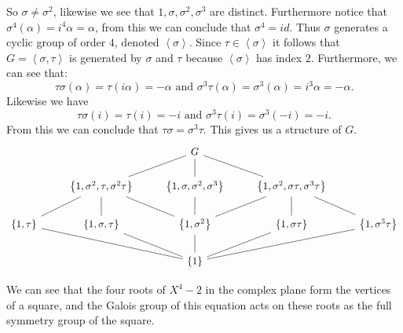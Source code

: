 \begin{example}[]
So $\sigma\neq \sigma^2$, likewise we see that $1,\sigma,\sigma^2,\sigma^3$ are distinct.
Furthermore notice that $\sigma^4(\alpha) = i^4\alpha = \alpha$, from this we can conclude that  $\sigma^4 = id$. Thus  $\sigma$ generates a cyclic group of order $4$, denoted $\left<\sigma \right>$. Since $\tau\in\left<\sigma \right>$ it follows that $G=\left<\sigma, \tau \right>$ is generated by $\sigma$ and $\tau$ because $\left<\sigma \right>$ has index $2$. Furthermore, we can see that: \[
    \tau\sigma(\alpha) = \tau(i\alpha) = -\alpha \text{ and }\sigma^3\tau(\alpha) = \sigma^3(\alpha) = i^3\alpha=-\alpha.
\]
Likewise we have \[
    \tau\sigma(i) = \tau(i) = -i \text{ and } \sigma^3\tau(i) = \sigma^3(-i) = -i.
\]
From this we can conclude that $\tau\sigma = \sigma^3\tau$. This gives us a structure of $G$. \begin{equation}
\begin{tikzcd}
   && G \ar[dr, dash] \ar[d, dash] \ar[dl, dash]  &&\\
   &\left\{ 1,\sigma^2,\tau,\sigma^2\tau \right\} \ar[dl, dash]\ar[d,dash]\ar[dr,dash]  & \left\{ 1,\sigma,\sigma^2,\sigma^3 \right\}\ar[d,dash] & \left\{ 1,\sigma^2, \sigma\tau,\sigma^3\tau \right\}\ar[dl,dash]\ar[d,dash]\ar[dr,dash] &\\
    \left\{1,\tau  \right\}\ar[drr,dash]  & \left\{ 1,\sigma,\tau \right\} \ar[dr,dash]& \left\{ 1,\sigma^2 \right\}  \ar[d,dash]& \left\{ 1,\sigma\tau \right\}\ar[dl,dash]& \left\{  1,\sigma^3\tau\right\}\ar[dll,dash]\\
                           && \left\{1\right\} &&
\end{tikzcd}
\end{equation}

\begin{bergman}
 We can see that the four roots of $X^4-2$ in the complex plane form the vertices of a square, and the Galois group of this equation acts on these roots as the full symmetry group of the square.
\end{bergman}
\end{example}

